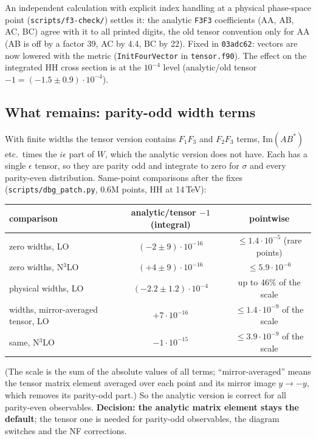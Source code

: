 \documentclass[11pt,a4paper]{article}
\newcommand{\commit}[1]{\texttt{#1}}
\newcommand{\file}[1]{\texttt{#1}}
\begin{document}
An independent calculation with explicit index handling at a physical
phase-space point (\file{scripts/f3-check/}) settles it: the analytic
\texttt{F3F3} coefficients (AA, AB, AC, BC) agree with it to all printed
digits, the old tensor convention only for AA (AB is off by a factor
39, AC by 4.4, BC by 22). Fixed in \commit{03adc62}: vectors are now
lowered with the metric (\texttt{InitFourVector} in \file{tensor.f90}).
The effect on the integrated HH cross section is at the $10^{-4}$ level
(analytic/old tensor $-1 = (-1.5\pm0.9)\cdot10^{-4}$).

\subsection{What remains: parity-odd width terms}

With finite widths the tensor version contains $F_1F_3$ and $F_2F_3$
terms, $\mathrm{Im}(AB^*)$ etc.\ times the $i\epsilon$ part of $W$,
which the analytic version does not have. Each has a single $\epsilon$
tensor, so they are parity odd and integrate to zero for $\sigma$ and
every parity-even distribution. Same-point comparisons after the fixes
(\file{scripts/dbg\_patch.py}, 0.6M points, HH at 14\,TeV):

\begin{center}
\small\setlength{\tabcolsep}{4pt}
\begin{tabular}{lcc}
\toprule
comparison & analytic/tensor $-1$ (integral) & pointwise\\
\midrule
zero widths, LO           & $(-2\pm9)\cdot10^{-16}$ & $\le1.4\cdot10^{-5}$ (rare points)\\
zero widths, N$^3$LO      & $(+4\pm9)\cdot10^{-16}$ & $\le5.9\cdot10^{-6}$\\
physical widths, LO       & $(-2.2\pm1.2)\cdot10^{-4}$ & up to 46\% of the scale\\
widths, mirror-averaged tensor, LO & $+7\cdot10^{-16}$ & $\le1.4\cdot10^{-9}$ of the scale\\
same, N$^3$LO             & $-1\cdot10^{-15}$ & $\le3.9\cdot10^{-9}$ of the scale\\
\bottomrule
\end{tabular}
\end{center}

\noindent (The scale is the sum of the absolute values of all terms;
``mirror-averaged'' means the tensor matrix element averaged over each
point and its mirror image $y\to-y$, which removes its parity-odd
part.)
So the analytic version is correct for all parity-even observables.
\textbf{Decision: the analytic matrix element stays the default}; the
tensor one is needed for parity-odd observables, the diagram switches
and the NF corrections.
\end{document}
